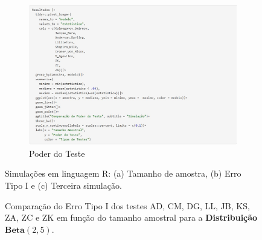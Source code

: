 \documentclass[final]{beamer}
\begin{document}
\begin{frame}[t]
\begin{columns}[t,totalwidth=0.6\paperwidth]
\begin{column}{0.45\textwidth}
\begin{figure}[H]
\begin{subfigure}[b]{0.33\linewidth}
        \centering
        \includegraphics[width=\linewidth]{fig3_simulacao.jpg}
        \caption{Poder do Teste}
        \label{fig:simulacao3}
    \end{subfigure}

    \caption{Simulações em linguagem R: (a) Tamanho de amostra, (b) Erro Tipo I e (c) Terceira simulação.}
    \label{fig:simulacoes}
\end{figure}


\setlength\fboxrule{1pt} %
\setlength\fboxsep{2pt}  %
\begin{figure}[H]
    \centering
    \caption{Comparação do Erro Tipo I dos testes AD, CM, DG, LL, JB, KS, ZA, ZC e ZK
    em função do tamanho amostral para a \textbf{Distribuição} \(\textbf{Beta}(2,5)\).}
    \label{fig:erro_tipo_I_beta}


\end{figure}
\end{column}
\end{columns}
\end{frame}
\end{document}

